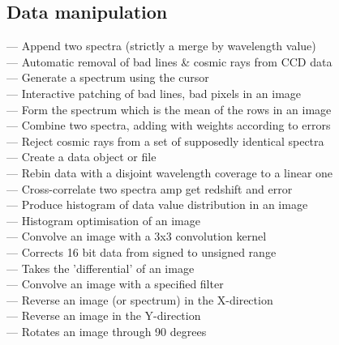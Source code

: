 
\subsection{\label{classifmanip}Data manipulation}

 --- Append two spectra (strictly a merge by wavelength value)\\
 --- Automatic removal of bad lines \& cosmic rays from CCD data\\
 --- Generate a spectrum using the cursor\\
 --- Interactive patching of bad lines, bad pixels in an image\\
 --- Form the spectrum which is the mean of the rows in an image\\
 --- Combine two spectra, adding with weights according to errors\\
 --- Reject cosmic rays from a set of supposedly identical spectra\\
 --- Create a data object or file\\
 --- Rebin data with a disjoint wavelength coverage to a linear one\\
 --- Cross-correlate two spectra amp get redshift and error\\
 --- Produce histogram of data value distribution in an image\\
 --- Histogram optimisation of an image\\
 --- Convolve an image with a 3x3 convolution kernel\\
 --- Corrects 16 bit data from signed to unsigned range\\
 --- Takes the 'differential' of an image\\
 --- Convolve an image with a specified filter\\
 --- Reverse an image (or spectrum) in the X-direction\\
 --- Reverse an image in the Y-direction\\
 --- Rotates an image through 90 degrees\\
